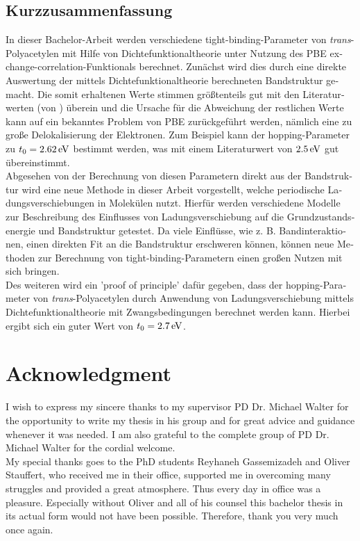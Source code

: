 \begin{otherlanguage}{german}
\chapter*{Kurzzusammenfassung}
In dieser Bachelor-Arbeit werden verschiedene tight-binding-Parameter von \linebreak\emph{trans}-Polyacetylen mit Hilfe von Dichtefunktionaltheorie unter Nutzung des PBE exchange-correlation-Funktionals berechnet. Zunächst wird dies durch eine direkte Auswertung der mittels Dichtefunktionaltheorie berechneten Bandstruktur gemacht. Die somit erhaltenen Werte stimmen größtenteils gut mit den Literaturwerten (von \cite{PhysRevLett.42.1698, doi:10.1021/cr990357p}) überein und die Ursache für die Abweichung der restlichen Werte kann auf ein bekanntes Problem von PBE zurückgeführt werden, nämlich eine zu große Delokalisierung der Elektronen. Zum Beispiel kann der hopping-Parameter zu $t_0 = \unit[2.62]{eV}$ bestimmt werden, was mit einem Literaturwert von $\unit[2.5]{eV}$ gut übereinstimmt.\\
Abgesehen von der Berechnung von diesen Parametern direkt aus der Bandstruktur wird eine neue Methode in dieser Arbeit vorgestellt, welche periodische Ladungsverschiebungen in Molekülen nutzt. Hierfür werden verschiedene Modelle zur Beschreibung des Einflusses von Ladungsverschiebung auf die Grundzustandsenergie und Bandstruktur getestet. Da viele Einflüsse, wie z. B. Bandinteraktionen, einen direkten Fit an die Bandstruktur erschweren können, können neue Methoden zur Berechnung von tight-binding-Parametern einen großen Nutzen mit sich bringen.\\
Des weiteren wird ein 'proof of principle' dafür gegeben, dass der hopping-Parameter von \emph{trans}-Polyacetylen durch Anwendung von Ladungsverschiebung mittels Dichtefunktionaltheorie mit Zwangsbedingungen berechnet werden kann. Hierbei ergibt sich ein guter Wert von $t_0 = \unit[2.7]{eV}$.
\end{otherlanguage}

\chapter*{Acknowledgment}

I wish to express my sincere thanks to my supervisor PD Dr. Michael Walter for the opportunity to write my thesis in his group and for great advice and guidance whenever it was needed. I am also grateful to the complete group of PD Dr. Michael Walter for the cordial welcome.\\
My special thanks goes to the PhD students Reyhaneh Gassemizadeh and Oliver Stauffert, who received me in their office, supported me in overcoming many struggles and provided a great atmosphere. Thus every day in office was a pleasure. Especially without Oliver and all of his counsel this bachelor thesis in its actual form would not have been possible. Therefore, thank you very much once again.
